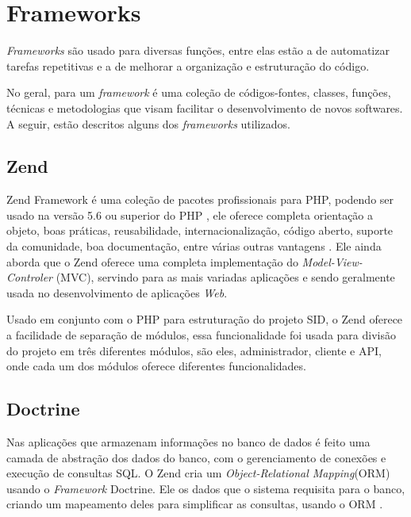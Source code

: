 
\section{Frameworks}
\textit{Frameworks} são usado para diversas funções, entre elas estão a de automatizar tarefas repetitivas e a de melhorar a organização e estruturação do código.  

No geral, para \citet{minetto2007} um \textit{framework} é uma coleção de códigos-fontes, classes, funções, técnicas e metodologias que visam facilitar o desenvolvimento de novos softwares. A seguir, estão descritos alguns dos \textit{frameworks} utilizados.

\subsection{Zend}
Zend Framework é uma coleção de pacotes profissionais para PHP, podendo ser usado na versão 5.6 ou superior do PHP \citet{zend2018}, ele oferece completa orientação a objeto, boas práticas, reusabilidade, internacionalização, código aberto, suporte da comunidade, boa documentação, entre várias outras vantagens \citet{vaswani2010}. Ele ainda aborda que o Zend oferece uma completa implementação do \textit{Model-View-Controler} (MVC), servindo para as mais variadas aplicações e sendo geralmente usada no desenvolvimento de aplicações \textit{Web}.

Usado em conjunto com o PHP para estruturação do projeto SID, o Zend oferece a facilidade de separação de módulos, essa funcionalidade foi usada para divisão do projeto em três diferentes módulos, são eles, administrador, cliente e API, onde cada um dos módulos oferece diferentes funcionalidades.

\subsection{Doctrine}
Nas aplicações que armazenam informações no banco de dados é feito uma camada de abstração dos dados do banco, com o gerenciamento de conexões e execução de consultas SQL. O Zend cria um \textit{Object-Relational Mapping}(ORM) usando o \textit{Framework} Doctrine. Ele os dados que o sistema requisita para o banco, criando um mapeamento deles para simplificar as consultas, usando o ORM \citep{vaswani2010}.

